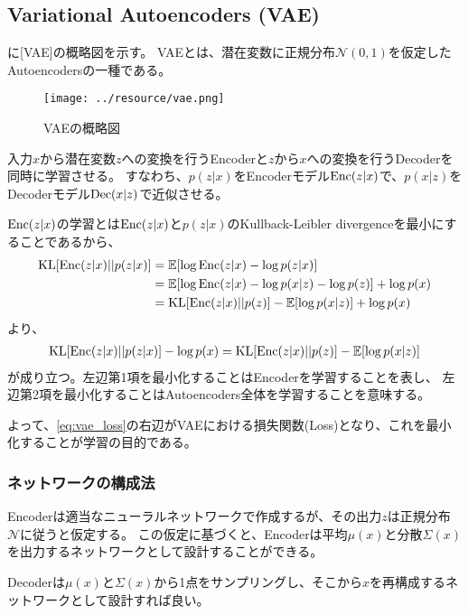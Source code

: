 \subsection{Variational Autoencoders (VAE)} \label{vae}

に[VAE]\cite{Kingma2014, Doersch2016}の概略図を示す。
VAEとは、潜在変数に正規分布$\mathcal{N}(0, 1)$を仮定したAutoencodersの一種である。
\begin{figure}[tbp]
    \centering
    \texttt{[image: ../resource/vae.png]}
    \caption{VAEの概略図} \label{fig:vae}
\end{figure}

入力$x$から潜在変数$z$への変換を行うEncoderと$z$から$x$への変換を行うDecoderを同時に学習させる。
すなわち、$p(z|x)$をEncoderモデル$\operatorname{Enc}(z|x)$で、$p(x|z)$をDecoderモデル$\operatorname{Dec}(x|z)$で近似させる。

$\operatorname{Enc}(z|x)$の学習とは$\operatorname{Enc}(z|x)$と$p(z|x)$のKullback-Leibler divergenceを最小にすることであるから、
\begin{align*}
    \operatorname{KL}[\operatorname{Enc}(z|x)||p(z|x)] &= \operatorname{\mathbb{E}}[\log \operatorname{Enc}(z|x) - \log p(z|x)]\\
    &= \operatorname{\mathbb{E}}[\log \operatorname{Enc}(z|x) - \log p(x|z) - \log p(z)] + \log p(x)\\
    &= \operatorname{KL}[\operatorname{Enc}(z|x)||p(z)] - \operatorname{\mathbb{E}}[\log p(x|z)] + \log p(x)
\end{align*}
より、
\begin{align}
    \operatorname{KL}[\operatorname{Enc}(z|x)||p(z|x)] - \log p(x) = \operatorname{KL}[\operatorname{Enc}(z|x)||p(z)] - \operatorname{\mathbb{E}}[\log p(x|z)] \label{eq:vae_loss}
\end{align}
が成り立つ。左辺第1項を最小化することはEncoderを学習することを表し、
左辺第2項を最小化することはAutoencoders全体を学習することを意味する。

よって、\eqref{eq:vae_loss}の右辺がVAEにおける損失関数(Loss)となり、これを最小化することが学習の目的である。

\subsubsection{ネットワークの構成法}

Encoderは適当なニューラルネットワークで作成するが、その出力$z$は正規分布$\mathcal{N}$に従うと仮定する。
この仮定に基づくと、Encoderは平均$\mu(x)$と分散$\Sigma(x)$を出力するネットワークとして設計することができる。

Decoderは$\mu(x)$と$\Sigma(x)$から1点をサンプリングし、そこから$x$を再構成するネットワークとして設計すれば良い。

